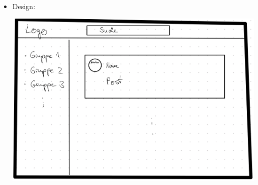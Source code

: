 \documentclass{article}
\begin{document}
\begin{enumerate}[label=(\alph*)]
\begin{itemize}
			\item Design:
			\begin{center}
				\includegraphics[scale = 0.2]{skizze.jpeg}
			\end{center}
		\end{itemize}
	\end{enumerate}
	
\end{document}
